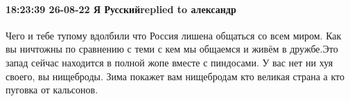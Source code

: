  
 
 
 
 

\paragraph{18:23:39 26-08-22 Я Русскийreplied to александр}

Чего и тебе тупому вдолбили что Россия лишена общаться со всем миром. Как вы
ничтожны по сравнению с теми с кем мы общаемся и живём в дружбе.Это запад
сейчас находится в полной жопе вместе с пиндосами. У вас нет ни хуя своего, вы
нищеброды. Зима покажет вам нищебродам кто великая страна а кто пуговка от
кальсонов.
